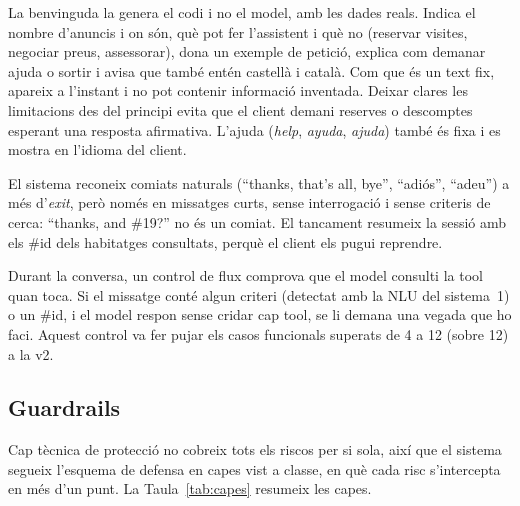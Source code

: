 \documentclass[10pt,a4paper]{article}
\begin{document}
La benvinguda la genera el codi i no el model, amb les dades reals. Indica el nombre d'anuncis i on són, què pot fer l'assistent i què no (reservar visites, negociar preus, assessorar), dona un exemple de petició, explica com demanar ajuda o sortir i avisa que també entén castellà i català. Com que és un text fix, apareix a l'instant i no pot contenir informació inventada. Deixar clares les limitacions des del principi evita que el client demani reserves o descomptes esperant una resposta afirmativa. L'ajuda (\emph{help}, \emph{ayuda}, \emph{ajuda}) també és fixa i es mostra en l'idioma del client.

El sistema reconeix comiats naturals (``thanks, that's all, bye'', ``adiós'', ``adeu'') a més d'\emph{exit}, però només en missatges curts, sense interrogació i sense criteris de cerca: ``thanks, and \#19?'' no és un comiat. El tancament resumeix la sessió amb els \#id dels habitatges consultats, perquè el client els pugui reprendre.

Durant la conversa, un control de flux comprova que el model consulti la tool quan toca. Si el missatge conté algun criteri (detectat amb la NLU del sistema~1) o un \#id, i el model respon sense cridar cap tool, se li demana una vegada que ho faci. Aquest control va fer pujar els casos funcionals superats de 4 a 12 (sobre 12) a la v2.

\subsection{Guardrails}

Cap tècnica de protecció no cobreix tots els riscos per si sola, així que el sistema segueix l'esquema de defensa en capes vist a classe, en què cada risc s'intercepta en més d'un punt. La Taula~\ref{tab:capes} resumeix les capes.
\end{document}
